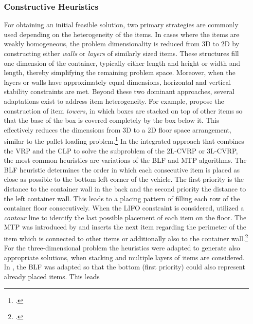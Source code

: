 \subsubsection{Constructive Heuristics}
For obtaining an initial feasible solution, two primary strategies are commonly
used depending on the heterogeneity of the items. In cases where the items are weakly homogeneous,
the problem dimensionality is reduced from 3D to 2D by constructing either
\textit{walls} or \textit{layers} of similarly sized items. These structures fill one
dimension of the container, typically either length and height or width and length, thereby
simplifying the remaining problem space. Moreover, when the layers or walls have approximately
equal dimensions, horizontal and vertical stability constraints are met.
Beyond these two dominant approaches, several adaptations exist to address item heterogeneity.
For example, \textcite{gehring_genetic_1997} propose the construction of item
\textit{towers}, in which boxes are stacked on top of other items so that the base of the box is covered completely
by the box below it. This effectively reduces the dimensions from 3D to a 2D floor space arrangement,
similar to the pallet loading problem.\footcite[cf.][pp. 402--406]{gehring_genetic_1997}
In the integrated approach that combines the \gls{VRP} and the \gls{CLP} to solve the subproblem of the \gls{2L-CVRP}
or \gls{3L-CVRP}, the most common heuristics are variations of the \gls{BLF} and \gls{MTP} algorithms.
The \gls{BLF} heuristic determines the order in which each consecutive item is placed as close as possible to the
bottom-left corner of the vehicle. The
first priority is the distance to the container wall in the back and the second priority the distance
to the left container wall. This leads to a placing pattern of filling each row of the container floor
consecutively.
When the \gls{LIFO} constraint is considered, \cite{iori_exact_2007} utilized a \textit{contour} line
to identify the last possible placement of each item on the floor. The \gls{MTP} was introduced by
\cite{zachariadis_guided_2009} and inserts the next item regarding the perimeter of the item which is connected
to other items or additionally also to the container wall.\footcite[cf.][p. 732f]{zachariadis_guided_2009}
For the three-dimensional problem the heuristics were adapted to generate also appropriate solutions, when
stacking and multiple layers of items are considered. In \cite{gendreau_tabu_2006}, the \gls{BLF} was
adapted so that the bottom (first priority) could also represent already placed items. This leads
